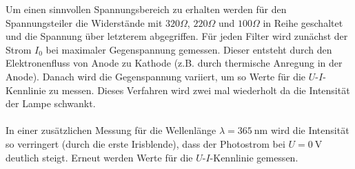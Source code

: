 Um einen sinnvollen Spannungsbereich zu erhalten werden für den Spannungsteiler die Widerstände mit $320\Omega$, $220\Omega$ und $100\Omega$ in Reihe geschaltet und die Spannung über letzterem abgegriffen. Für jeden Filter wird zunächst der Strom $I_0$ bei maximaler Gegenspannung gemessen. Dieser entsteht durch den Elektronenfluss von Anode zu Kathode (z.B. durch thermische Anregung in der Anode). Danach wird die Gegenspannung variiert, um so Werte für die $U$-$I$-Kennlinie zu messen. Dieses Verfahren wird zwei mal wiederholt da die Intensität der Lampe schwankt. \\ \\
In einer zusätzlichen Messung für die Wellenlänge $\lambda=\si{365 \ \nano \metre}$ wird die Intensität so verringert (durch die erste Irisblende), dass der Photostrom bei $U=\si{0 \ \volt}$ deutlich steigt. Erneut werden Werte für die $U$-$I$-Kennlinie gemessen.

